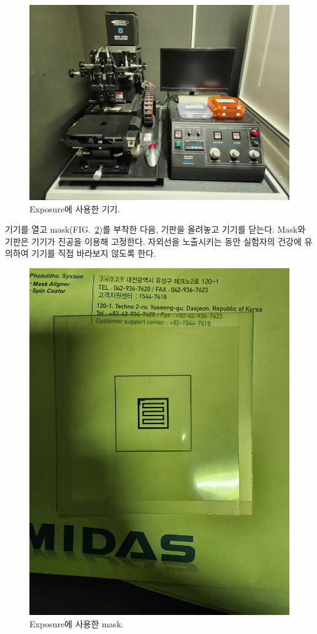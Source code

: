 \documentclass[aps,reprint,superscriptaddress,10pt]{revtex4-2}
\begin{document}
\begin{itemize}
  \begin{figure}[htbp]
    \centering
    \includegraphics[scale=0.04]{violet.JPG}
    \caption{Exposure에 사용한 기기.}
    \label{fig:violet}
  \end{figure}
  기기를 열고 mask(FIG.~\ref{fig:mask})를 부착한 다음, 기판을 올려놓고 기기를 닫는다.
  Mask와 기판은 기기가 진공을 이용해 고정한다. 자외선을 노출시키는 동안
  실험자의 건강에 유의하여 기기를 직접 바라보지 않도록 한다.
  \begin{figure}[htbp]
    \centering
    \includegraphics[scale=0.04]{mask.JPG}
    \caption{Exposure에 사용한 mask.}
    \label{fig:mask}
  \end{figure}


\end{itemize}
\end{document}

